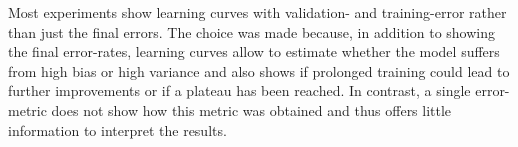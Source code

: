 Most experiments show learning curves with validation- and training-error rather than just the final errors. The choice was made because, in addition to showing the final error-rates, learning curves allow to estimate whether the model suffers from high bias or high variance and also shows if prolonged training could lead to further improvements or if a plateau has been reached. In contrast, a single error-metric does not show how this metric was obtained and thus offers little information to interpret the results.


